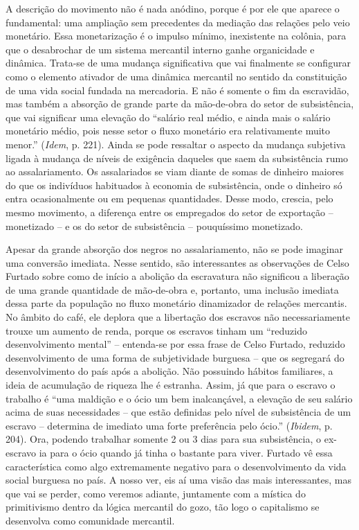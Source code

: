 A descrição do movimento não é nada anódino, porque é por ele que
aparece o fundamental: uma ampliação sem precedentes da mediação das
relações pelo veio monetário. Essa monetarização é o impulso mínimo,
inexistente na colônia, para que o desabrochar de um sistema mercantil
interno ganhe organicidade e dinâmica. Trata-se de uma mudança
significativa que vai finalmente se configurar como o elemento ativador
de uma dinâmica mercantil no sentido da constituição de uma vida social
fundada na mercadoria. E não é somente o fim da escravidão, mas também a
absorção de grande parte da mão-de-obra do setor de subsistência, que
vai significar uma elevação do ``salário real médio, e ainda mais o
salário monetário médio, pois nesse setor o fluxo monetário era
relativamente muito menor.'' (\emph{Idem}, p. 221). Ainda se pode
ressaltar o aspecto da mudança subjetiva ligada à mudança de níveis de
exigência daqueles que saem da subsistência rumo ao assalariamento. Os
assalariados se viam diante de somas de dinheiro maiores do que os
indivíduos habituados à economia de subsistência, onde o dinheiro só
entra ocasionalmente ou em pequenas quantidades. Desse modo, crescia,
pelo mesmo movimento, a diferença entre os empregados do setor de
exportação -- monetizado -- e os do setor de subsistência -- pouquíssimo
monetizado.

Apesar da grande absorção dos negros no assalariamento, não se pode
imaginar uma conversão imediata. Nesse sentido, são interessantes as
observações de Celso Furtado sobre como de início a abolição da
escravatura não significou a liberação de uma grande quantidade de
mão-de-obra e, portanto, uma inclusão imediata dessa parte da população
no fluxo monetário dinamizador de relações mercantis. No âmbito do café,
ele deplora que a libertação dos escravos não necessariamente trouxe um
aumento de renda, porque os escravos tinham um ``reduzido
desenvolvimento mental'' -- entenda-se por essa frase de Celso Furtado,
reduzido desenvolvimento de uma forma de subjetividade burguesa -- que
os segregará do desenvolvimento do país após a abolição. Não possuindo
hábitos familiares, a ideia de acumulação de riqueza lhe é estranha.
Assim, já que para o escravo o trabalho é ``uma maldição e o ócio um bem
inalcançável, a elevação de seu salário acima de suas necessidades --
que estão definidas pelo nível de subsistência de um escravo --
determina de imediato uma forte preferência pelo ócio.'' (\emph{Ibidem},
p. 204). Ora, podendo trabalhar somente 2 ou 3 dias para sua
subsistência, o ex-escravo ia para o ócio quando já tinha o bastante
para viver. Furtado vê essa característica como algo extremamente
negativo para o desenvolvimento da vida social burguesa no país. A nosso
ver, eis aí uma visão das mais interessantes, mas que vai se perder,
como veremos adiante, juntamente com a mística do primitivismo dentro da
lógica mercantil do gozo, tão logo o capitalismo se desenvolva como
comunidade mercantil.

